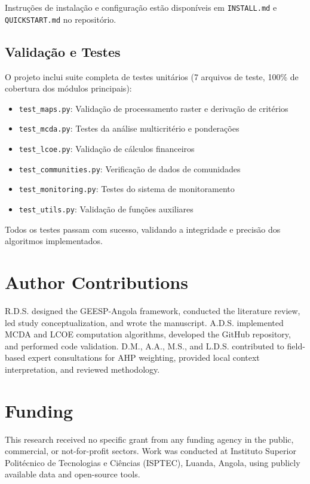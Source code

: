 \documentclass[12pt, a4paper]{article}
\begin{document}
Instruções de instalação e configuração estão disponíveis em \texttt{INSTALL.md} e \texttt{QUICKSTART.md} no repositório.

\subsection{Validação e Testes}

O projeto inclui suite completa de testes unitários (7 arquivos de teste, 100\% de cobertura dos módulos principais):

\begin{itemize}
    \item \texttt{test\_maps.py}: Validação de processamento raster e derivação de critérios
    \item \texttt{test\_mcda.py}: Testes da análise multicritério e ponderações
    \item \texttt{test\_lcoe.py}: Validação de cálculos financeiros
    \item \texttt{test\_communities.py}: Verificação de dados de comunidades
    \item \texttt{test\_monitoring.py}: Testes do sistema de monitoramento
    \item \texttt{test\_utils.py}: Validação de funções auxiliares
\end{itemize}

Todos os testes passam com sucesso, validando a integridade e precisão dos algoritmos implementados.

\section*{Author Contributions}
R.D.S. designed the GEESP-Angola framework, conducted the literature review, led study conceptualization, and wrote the manuscript. A.D.S. implemented MCDA and LCOE computation algorithms, developed the GitHub repository, and performed code validation. D.M., A.A., M.S., and L.D.S. contributed to field-based expert consultations for AHP weighting, provided local context interpretation, and reviewed methodology.

\section*{Funding}
This research received no specific grant from any funding agency in the public, commercial, or not-for-profit sectors. Work was conducted at Instituto Superior Politécnico de Tecnologias e Ciências (ISPTEC), Luanda, Angola, using publicly available data and open-source tools.
\end{document}

